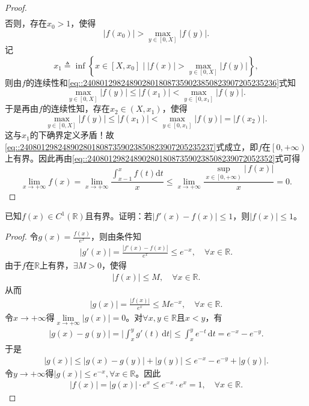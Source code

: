 \documentclass[../../main.tex]{subfiles}%
\begin{document}
\begin{proof}
\begin{align}
\end{align}
否则，存在$x_0>1$，使得
\[
\left| f\left( x_0 \right) \right|>\max_{y\in \left[ 0,X \right]} \left| f\left( y \right) \right|.
\]
记
\[
x_1\triangleq \inf\left\{ x\in \left[ X,x_0 \right] \mid \left| f\left( x \right) \right|>\max_{y\in \left[ 0,X \right]} \left| f\left( y \right) \right| \right\},
\]
则由$f$的连续性和\eqref{eq::2408012982489028018087359023850823907205235236}式知
\[
\max_{y\in \left[ 0,X \right]} \left| f\left( y \right) \right|\leqslant \left| f\left( x_1 \right) \right|<\max_{y\in \left[ 0,x_1 \right]} \left| f\left( y \right) \right|.
\]
于是再由$f$的连续性知，存在$x_2\in \left( X,x_1 \right)$，使得
\[
\max_{y\in \left[ 0,X \right]} \left| f\left( y \right) \right|\leqslant \left| f\left( x_1 \right) \right|<\max_{y\in \left[ 0,x_1 \right]} \left| f\left( y \right) \right|=\left| f\left( x_2 \right) \right|.
\]
这与$x_1$的下确界定义矛盾！故\eqref{eq::2408012982489028018087359023850823907205235237}式成立，即$f$在$\left[ 0,+\infty \right)$上有界。因此再由\eqref{eq::24080129824890280180873590238508239072052352}式可得
\[
\lim_{x\rightarrow +\infty} f\left( x \right) =\lim_{x\rightarrow +\infty} \frac{\int_{x-1}^x{f\left( t \right) \mathrm{d}t}}{x}\leqslant \lim_{x\rightarrow +\infty} \frac{\sup\limits_{x\in \left[ 0,+\infty \right)} \left| \,f\left( x \right) \right|}{x}=0.
\]

\end{proof}

\begin{example}
已知$f(x)\in C^1(\mathbb{R})$且有界。证明：若$|f'(x)-f(x)|\leqslant 1$，则$|f(x)|\leqslant 1$。
\end{example}
\begin{proof}

令$g(x)=\frac{f(x)}{e^x}$，则由条件知
\begin{align*}
|g'(x)|=\frac{|f'(x)-f(x)|}{e^x}\leqslant e^{-x},\quad \forall x\in\mathbb{R}.
\end{align*}
由于$f$在$\mathbb{R}$上有界，$\exists M>0$，使得
\begin{align*}
|f(x)|\leqslant M,\quad \forall x\in\mathbb{R}.
\end{align*}
从而
\begin{align*}
|g(x)|=\frac{|f(x)|}{e^x}\leqslant M e^{-x},\quad \forall x\in\mathbb{R}.
\end{align*}
令$x\to+\infty$得$\lim\limits_{x\to+\infty}|g(x)|=0$。对$\forall x,y\in\mathbb{R}$且$x<y$，有
\begin{align*}
|g(x)-g(y)|=\biggl|\int_{x}^{y}g'(t)\,\mathrm{d}t\biggr|\leqslant \int_{x}^{y}e^{-t}\,\mathrm{d}t=e^{-x}-e^{-y}.
\end{align*}
于是
\begin{align*}
|g(x)|\leqslant |g(x)-g(y)|+|g(y)|\leqslant e^{-x}-e^{-y}+|g(y)|.
\end{align*}
令$y\to+\infty$得$|g(x)|\leqslant e^{-x},\forall x\in\mathbb{R}$。因此
\begin{align*}
|f(x)|=|g(x)|\cdot e^x\leqslant e^{-x}\cdot e^x=1,\quad \forall x\in\mathbb{R}.
\end{align*}
\end{proof}
\end{document}

